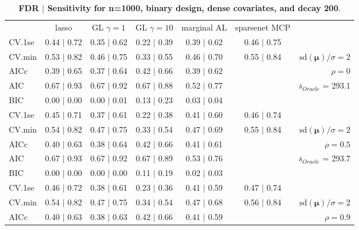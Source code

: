 \begin{table}\vspace{-.5cm}
\caption[l]{ {\it }
{ \bf FDR $\boldsymbol{\mid}$ Sensitivity for n=1000, binary design, dense covariates, and  decay  200}.}
\vspace{-.5cm}
\footnotesize{}
\begin{center}
\begin{tabular}{l*{5}{c}|r}
 & lasso & GL $\gamma=1$ & GL $\gamma=10$ & marginal AL & sparsenet MCP  & \\
 \cline{1-7}
CV.1se & 0.44 $\mid$ 0.72 & 0.35 $\mid$ 0.62 & 0.22 $\mid$ 0.39 & 0.39 $\mid$ 0.62 & 0.46 $\mid$ 0.75 & \\
CV.min & 0.53 $\mid$ 0.82 & 0.46 $\mid$ 0.75 & 0.33 $\mid$ 0.55 & 0.46 $\mid$ 0.70 & 0.55 $\mid$ 0.84 &  $\mathrm{sd}(\mathbf{\mu})/\sigma=2$ \\
AICc & 0.39 $\mid$ 0.65 & 0.37 $\mid$ 0.64 & 0.42 $\mid$ 0.66 & 0.39 $\mid$ 0.62 & & $\rho=0$ \\
AIC & 0.67 $\mid$ 0.93 & 0.67 $\mid$ 0.92 & 0.67 $\mid$ 0.88 & 0.52 $\mid$ 0.77 & &  \multirow{2}{*}{$\bar{s}_{Oracle}$ = 293.1} \\
BIC & 0.00 $\mid$ 0.00 & 0.00 $\mid$ 0.01 & 0.13 $\mid$ 0.23 & 0.03 $\mid$ 0.04 & &  \\
 \hline 
CV.1se & 0.45 $\mid$ 0.71 & 0.37 $\mid$ 0.61 & 0.22 $\mid$ 0.38 & 0.41 $\mid$ 0.60 & 0.46 $\mid$ 0.74 & \\
CV.min & 0.54 $\mid$ 0.82 & 0.47 $\mid$ 0.75 & 0.33 $\mid$ 0.54 & 0.47 $\mid$ 0.69 & 0.55 $\mid$ 0.84 &  $\mathrm{sd}(\mathbf{\mu})/\sigma=2$ \\
AICc & 0.40 $\mid$ 0.63 & 0.38 $\mid$ 0.64 & 0.42 $\mid$ 0.66 & 0.41 $\mid$ 0.61 & & $\rho=0.5$ \\
AIC & 0.67 $\mid$ 0.93 & 0.67 $\mid$ 0.92 & 0.67 $\mid$ 0.89 & 0.53 $\mid$ 0.76 & &  \multirow{2}{*}{$\bar{s}_{Oracle}$ = 293.7} \\
BIC & 0.00 $\mid$ 0.00 & 0.00 $\mid$ 0.00 & 0.11 $\mid$ 0.19 & 0.02 $\mid$ 0.03 & &  \\
 \hline 
CV.1se & 0.46 $\mid$ 0.72 & 0.38 $\mid$ 0.61 & 0.23 $\mid$ 0.36 & 0.41 $\mid$ 0.59 & 0.47 $\mid$ 0.74 & \\
CV.min & 0.54 $\mid$ 0.82 & 0.47 $\mid$ 0.75 & 0.34 $\mid$ 0.54 & 0.47 $\mid$ 0.68 & 0.56 $\mid$ 0.84 &  $\mathrm{sd}(\mathbf{\mu})/\sigma=2$ \\
AICc & 0.40 $\mid$ 0.63 & 0.38 $\mid$ 0.63 & 0.42 $\mid$ 0.66 & 0.41 $\mid$ 0.59 & & $\rho=0.9$ \\

\end{tabular}
\end{center}
\end{table}
